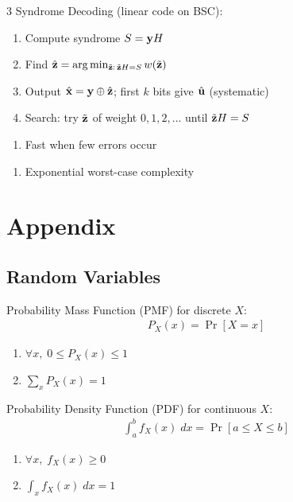\documentclass[12pt, a4paper]{article}
\begin{document}
\begin{multicols*}{3}
Syndrome Decoding (linear code on BSC):
\begin{enumerate}[\roman*.]
  \item Compute syndrome $S=\mathbf{y} H$
  \item Find $\hat{\mathbf{z}}=\arg\min_{\tilde{\mathbf{z}}:\,\tilde{\mathbf{z}} H=S}w(\tilde{\mathbf{z}})$
  \item Output $\hat{\mathbf{x}}=\mathbf{y}\oplus\hat{\mathbf{z}}$; first $k$ bits give $\hat{\mathbf{u}}$ (systematic)
  \item Search: try $\tilde{\mathbf{z}}$ of weight $0,1,2,\dots$ until $\tilde{\mathbf{z}} H=S$
\end{enumerate}
\begin{enumerate}[$+$]
  \item Fast when few errors occur
\end{enumerate}
\vspace{1pt}
\begin{enumerate}[$-$]
  \item Exponential worst-case complexity
\end{enumerate}
\colbreak
\section*{Appendix}
\subsection{Random Variables}
Probability Mass Function (PMF) for discrete $X$:
\begin{align*}
  P_X(x) = \Pr[X=x] 
\end{align*}
\begin{enumerate}[\roman*.]
  \item $\forall x,\;0 \leq P_X(x) \leq 1$
  \item $\sum_{x} P_X(x) = 1$
\end{enumerate}

Probability Density Function (PDF) for continuous $X$:
\begin{align*}
  \int^b_a f_X(x)\;dx = \Pr[a\leq X \leq b] 
\end{align*}
\begin{enumerate}[\roman*.]
  \item $\forall x,\;f_X(x) \geq 0$ 
  \item $\int_{x} f_X(x)\;dx = 1$
\end{enumerate}


\end{multicols*}
\end{document}
